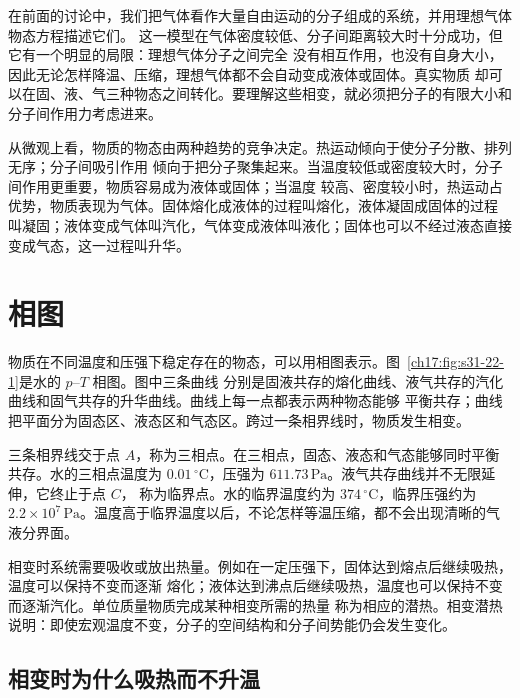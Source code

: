{在前面的讨论中，我们把气体看作大量自由运动的分子组成的系统，并用理想气体物态方程描述它们。
这一模型在气体密度较低、分子间距离较大时十分成功，但它有一个明显的局限：理想气体分子之间完全
没有相互作用，也没有自身大小，因此无论怎样降温、压缩，理想气体都不会自动变成液体或固体。真实物质
却可以在固、液、气三种物态之间转化。要理解这些相变，就必须把分子的有限大小和分子间作用力考虑进来。

从微观上看，物质的物态由两种趋势的竞争决定。热运动倾向于使分子分散、排列无序；分子间吸引作用
倾向于把分子聚集起来。当温度较低或密度较大时，分子间作用更重要，物质容易成为液体或固体；当温度
较高、密度较小时，热运动占优势，物质表现为气体。固体熔化成液体的过程叫熔化，液体凝固成固体的过程
叫凝固；液体变成气体叫汽化，气体变成液体叫液化；固体也可以不经过液态直接变成气态，这一过程叫升华。

\section{相图}

物质在不同温度和压强下稳定存在的物态，可以用相图表示。图~\ref{ch17:fig:s31-22-1}是水的 $p$--$T$ 相图。图中三条曲线
分别是固液共存的熔化曲线、液气共存的汽化曲线和固气共存的升华曲线。曲线上每一点都表示两种物态能够
平衡共存；曲线把平面分为固态区、液态区和气态区。跨过一条相界线时，物质发生相变。

\par\noindent\begin{minipage}{\linewidth}
\phaseDiagramWater
{}\label{ch17:fig:s31-22-1}
\end{minipage}\par\medskip

三条相界线交于点 $A$，称为三相点。在三相点，固态、液态和气态能够同时平衡共存。水的三相点温度为
$0.01\,{}^{\circ}\mathrm C$，压强为 $611.73\,\mathrm{Pa}$。液气共存曲线并不无限延伸，它终止于点 $C$，
称为临界点。水的临界温度约为 $374\,{}^{\circ}\mathrm C$，临界压强约为
$2.2\times10^7\,\mathrm{Pa}$。温度高于临界温度以后，不论怎样等温压缩，都不会出现清晰的气液分界面。

相变时系统需要吸收或放出热量。例如在一定压强下，固体达到熔点后继续吸热，温度可以保持不变而逐渐
熔化；液体达到沸点后继续吸热，温度也可以保持不变而逐渐汽化。单位质量物质完成某种相变所需的热量
称为相应的潜热。相变潜热说明：即使宏观温度不变，分子的空间结构和分子间势能仍会发生变化。

\subsection{相变时为什么吸热而不升温}

}
